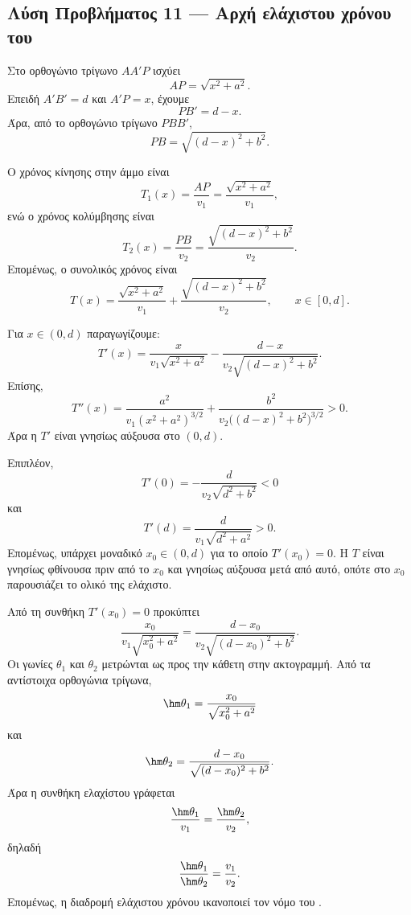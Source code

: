 \subsection*{Λύση Προβλήματος 11 --- Αρχή ελάχιστου χρόνου του }

\begin{alist}
  \item Στο ορθογώνιο τρίγωνο $AA'P$ ισχύει
        \[
          AP=\sqrt{x^2+a^2}.
        \]
        Επειδή $A'B'=d$ και $A'P=x$, έχουμε
        \[
          PB'=d-x.
        \]
        Άρα, από το ορθογώνιο τρίγωνο $PBB'$,
        \[
          PB=\sqrt{(d-x)^2+b^2}.
        \]

        Ο χρόνος κίνησης στην άμμο είναι
        \[
          T_1(x)=\frac{AP}{v_1}
          =\frac{\sqrt{x^2+a^2}}{v_1},
        \]
        ενώ ο χρόνος κολύμβησης είναι
        \[
          T_2(x)=\frac{PB}{v_2}
          =\frac{\sqrt{(d-x)^2+b^2}}{v_2}.
        \]
        Επομένως, ο συνολικός χρόνος είναι
        \[
          {
          T(x)=\frac{\sqrt{x^2+a^2}}{v_1}
          +\frac{\sqrt{(d-x)^2+b^2}}{v_2}},
          \qquad x\in[0,d].
        \]

  \item Για $x\in(0,d)$ παραγωγίζουμε:
        \[
          T'(x)
          =
          \frac{x}{v_1\sqrt{x^2+a^2}}
          -
          \frac{d-x}{v_2\sqrt{(d-x)^2+b^2}}.
        \]
        Επίσης,
        \[
          T''(x)
          =
          \frac{a^2}{v_1(x^2+a^2)^{3/2}}
          +
          \frac{b^2}{v_2\bigl((d-x)^2+b^2\bigr)^{3/2}}>0.
        \]
        Άρα η $T'$ είναι γνησίως αύξουσα στο $(0,d)$.

        Επιπλέον,
        \[
          T'(0)=-\frac{d}{v_2\sqrt{d^2+b^2}}<0
        \]
        και
        \[
          T'(d)=\frac{d}{v_1\sqrt{d^2+a^2}}>0.
        \]
        Επομένως, υπάρχει μοναδικό $x_0\in(0,d)$ για το οποίο
        $T'(x_0)=0$. Η $T$ είναι γνησίως φθίνουσα πριν από το $x_0$
        και γνησίως αύξουσα μετά από αυτό, οπότε στο $x_0$ παρουσιάζει
        το ολικό της ελάχιστο.

        Από τη συνθήκη $T'(x_0)=0$ προκύπτει
        \[
          \frac{x_0}{v_1\sqrt{x_0^2+a^2}}
          =
          \frac{d-x_0}
          {v_2\sqrt{(d-x_0)^2+b^2}}.
        \]
        Οι γωνίες $\theta_1$ και $\theta_2$ μετρώνται ως προς την
        κάθετη στην ακτογραμμή. Από τα αντίστοιχα ορθογώνια τρίγωνα,
        \[
          \hm\theta_1
          =\frac{x_0}{\sqrt{x_0^2+a^2}}
        \]
        και
        \[
          \hm\theta_2
          =\frac{d-x_0}{\sqrt{(d-x_0)^2+b^2}}.
        \]
        Άρα η συνθήκη ελαχίστου γράφεται
        \[
          \frac{\hm\theta_1}{v_1}
          =
          \frac{\hm\theta_2}{v_2},
        \]
        δηλαδή
        \[
          {
          \frac{\hm\theta_1}{\hm\theta_2}
          =\frac{v_1}{v_2}}.
        \]
        Επομένως, η διαδρομή ελάχιστου χρόνου ικανοποιεί τον νόμο του
        .
\end{alist}
